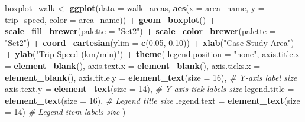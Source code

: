 \documentclass[
]{article}
\newenvironment{Shaded}{\begin{snugshade}}{\end{snugshade}}
\newcommand{\AttributeTok}[1]{\textcolor[rgb]{0.13,0.29,0.53}{#1}}
\newcommand{\CommentTok}[1]{\textcolor[rgb]{0.56,0.35,0.01}{\textit{#1}}}
\newcommand{\DecValTok}[1]{\textcolor[rgb]{0.00,0.00,0.81}{#1}}
\newcommand{\FloatTok}[1]{\textcolor[rgb]{0.00,0.00,0.81}{#1}}
\newcommand{\FunctionTok}[1]{\textcolor[rgb]{0.13,0.29,0.53}{\textbf{#1}}}
\newcommand{\NormalTok}[1]{#1}
\newcommand{\OtherTok}[1]{\textcolor[rgb]{0.56,0.35,0.01}{#1}}
\newcommand{\SpecialCharTok}[1]{\textcolor[rgb]{0.81,0.36,0.00}{\textbf{#1}}}
\newcommand{\StringTok}[1]{\textcolor[rgb]{0.31,0.60,0.02}{#1}}
\begin{document}
\begin{Shaded}
\begin{Highlighting}[]
\NormalTok{boxplot\_walk }\OtherTok{\textless{}{-}} \FunctionTok{ggplot}\NormalTok{(}\AttributeTok{data =}\NormalTok{ walk\_areas, }\FunctionTok{aes}\NormalTok{(}\AttributeTok{x =}\NormalTok{ area\_name, }\AttributeTok{y =}\NormalTok{ trip\_speed, }\AttributeTok{color =}\NormalTok{ area\_name)) }\SpecialCharTok{+} 
  \FunctionTok{geom\_boxplot}\NormalTok{() }\SpecialCharTok{+} 
  \FunctionTok{scale\_fill\_brewer}\NormalTok{(}\AttributeTok{palette =} \StringTok{"Set2"}\NormalTok{) }\SpecialCharTok{+} 
  \FunctionTok{scale\_color\_brewer}\NormalTok{(}\AttributeTok{palette =} \StringTok{"Set2"}\NormalTok{) }\SpecialCharTok{+} 
  \FunctionTok{coord\_cartesian}\NormalTok{(}\AttributeTok{ylim =} \FunctionTok{c}\NormalTok{(}\FloatTok{0.05}\NormalTok{, }\FloatTok{0.10}\NormalTok{)) }\SpecialCharTok{+}
  \FunctionTok{xlab}\NormalTok{(}\StringTok{"Case Study Area"}\NormalTok{) }\SpecialCharTok{+} 
  \FunctionTok{ylab}\NormalTok{(}\StringTok{"Trip Speed (km/min)"}\NormalTok{) }\SpecialCharTok{+} 
  \FunctionTok{theme}\NormalTok{(}
    \AttributeTok{legend.position =} \StringTok{"none"}\NormalTok{, }
    \AttributeTok{axis.title.x =} \FunctionTok{element\_blank}\NormalTok{(), }
    \AttributeTok{axis.text.x =} \FunctionTok{element\_blank}\NormalTok{(), }
    \AttributeTok{axis.ticks.x =} \FunctionTok{element\_blank}\NormalTok{(),}
    \AttributeTok{axis.title.y =} \FunctionTok{element\_text}\NormalTok{(}\AttributeTok{size =} \DecValTok{16}\NormalTok{),      }\CommentTok{\# Y{-}axis label size}
    \AttributeTok{axis.text.y =} \FunctionTok{element\_text}\NormalTok{(}\AttributeTok{size =} \DecValTok{14}\NormalTok{),       }\CommentTok{\# Y{-}axis tick labels size}
    \AttributeTok{legend.title =} \FunctionTok{element\_text}\NormalTok{(}\AttributeTok{size =} \DecValTok{16}\NormalTok{),      }\CommentTok{\# Legend title size}
    \AttributeTok{legend.text =} \FunctionTok{element\_text}\NormalTok{(}\AttributeTok{size =} \DecValTok{14}\NormalTok{)        }\CommentTok{\# Legend item labels size}
\NormalTok{  )}


\end{Highlighting}
\end{Shaded}
\end{document}
